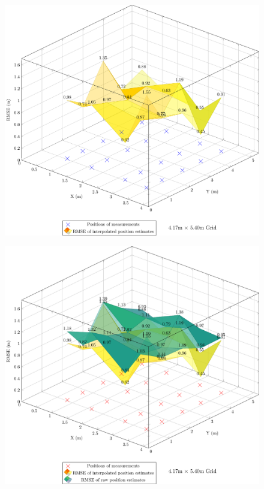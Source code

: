\documentclass[a4paper, oneside]{ipsreport}
\begin{document}
\begin{figure}[H]
	\centering
	\includegraphics[width=0.8\linewidth]{./figures/rmse/fixedMseSign.pdf}
	\label{fig:11window10avg}

	\vspace{1cm}

	\includegraphics[width=0.8\linewidth]{./figures/rmse/fixedMseSignInterpolationOverlay.pdf}
	\label{fig:rawinterpolatedcomparison}
\end{figure}
\end{document}
